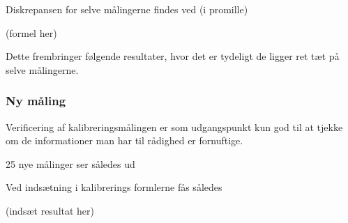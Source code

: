 Diskrepansen for selve målingerne findes ved (i promille)

(formel her)


Dette frembringer følgende resultater, hvor det er tydeligt de ligger ret tæt på selve målingerne.



\subsubsection{Ny måling}

Verificering af kalibreringsmålingen er som udgangspunkt kun god til at tjekke om de informationer man har til rådighed er fornuftige.

25 nye målinger ser således ud

Ved indsætning i kalibrerings formlerne fås således

(indsæt resultat her)


